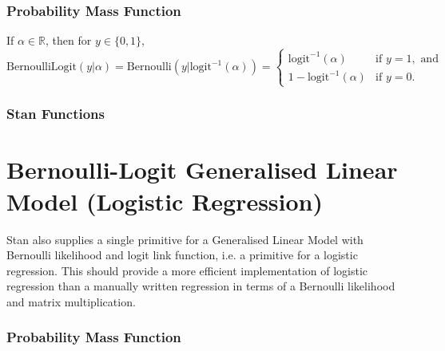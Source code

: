 \begin{description}
\subsubsection{Probability Mass Function}


If $\alpha \in \mathbb{R}$, then for $y \in \{0,1\}$, \[ \text{BernoulliLogit}(y|\alpha) = \text{Bernoulli}(y | \text{logit}^{-1}(\alpha)) = \left\{ \begin{array}{ll} \text{logit}^{-1}(\alpha) & \text{if } y = 1, \text{ and} \\ 1 - \text{logit}^{-1}(\alpha) &  \text{if } y = 0. \end{array} \right. \] 



\subsubsection{Stan Functions}


\begin{description}  \end{description}


\begin{description}    \end{description}


\section{Bernoulli-Logit Generalised Linear Model (Logistic Regression)}\label{bernoulli-logit-glm.section}


Stan also supplies a single primitive for a Generalised Linear Model with Bernoulli likelihood and logit link function, i.e. a primitive for a logistic regression. This should provide a more efficient implementation of logistic regression than a manually written regression in terms of a Bernoulli likelihood and matrix multiplication.


\subsubsection{Probability Mass Function}



\end{description}
